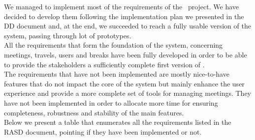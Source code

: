 We managed to implement most of the requirements of the \projectname~project. We have decided to develop them following the implementation plan we presented in the DD document and, at the end, we succeeded to reach a fully usable version of the system, passing through lot of prototypes. \\
All the requirements that form the foundation of the system, concerning meetings, travels, users and breaks have been fully developed in order to be able to provide the stakeholders a sufficiently complete first version of \projectname. \\
The requirements that have not been implemented are mostly nice-to-have features that do not impact the core of the system but mainly enhance the user experience and provide a more complete set of tools for managing meetings. They have not been implemented in order to allocate more time for ensuring completeness, robustness and stability of the main features.\\ 
Below we present a table that enumerates all the requirements listed in the RASD document, pointing if they have been implemented or not.

\newcommand{\reqNum}{\stepcounter{countReq}\thecountReq}

